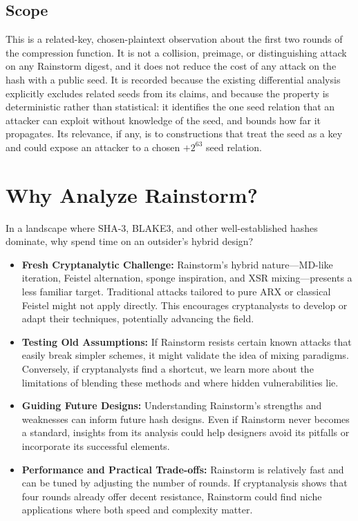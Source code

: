 \documentclass[11pt,a4paper]{article}
\begin{document}
\subsection*{Scope}

This is a related-key, chosen-plaintext observation about the first two rounds
of the compression function. It is not a collision, preimage, or distinguishing
attack on any Rainstorm digest, and it does not reduce the cost of any attack on
the hash with a public seed. It is recorded because the existing differential
analysis explicitly excludes related seeds from its claims, and because the
property is deterministic rather than statistical: it identifies the one seed
relation that an attacker can exploit without knowledge of the seed, and bounds
how far it propagates. Its relevance, if any, is to constructions that treat the
seed as a key and could expose an attacker to a chosen \( +2^{63} \) seed
relation.

\section*{Why Analyze Rainstorm?}
In a landscape where SHA-3, BLAKE3, and other well-established hashes dominate, why spend time on an outsider’s hybrid design?

\begin{itemize}
  \item \textbf{Fresh Cryptanalytic Challenge:} Rainstorm’s hybrid nature—MD-like iteration, Feistel alternation, sponge inspiration, and XSR mixing—presents a less familiar target. Traditional attacks tailored to pure ARX or classical Feistel might not apply directly. This encourages cryptanalysts to develop or adapt their techniques, potentially advancing the field.

  \item \textbf{Testing Old Assumptions:} If Rainstorm resists certain known attacks that easily break simpler schemes, it might validate the idea of mixing paradigms. Conversely, if cryptanalysts find a shortcut, we learn more about the limitations of blending these methods and where hidden vulnerabilities lie.

  \item \textbf{Guiding Future Designs:} Understanding Rainstorm’s strengths and weaknesses can inform future hash designs. Even if Rainstorm never becomes a standard, insights from its analysis could help designers avoid its pitfalls or incorporate its successful elements.

  \item \textbf{Performance and Practical Trade-offs:} Rainstorm is relatively fast and can be tuned by adjusting the number of rounds. If cryptanalysis shows that four rounds already offer decent resistance, Rainstorm could find niche applications where both speed and complexity matter.
\end{itemize}
\end{document}
